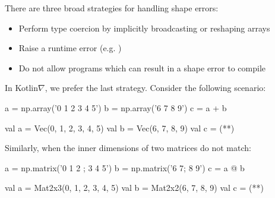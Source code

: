 \documentclass[portrait,a0b,final,a4resizeable]{a0poster}
\begin{document}
\begin{poster}
\begin{multicols}{2}
      \vspace*{-1cm}
      \null\hspace*{3cm}\begin{minipage}[c]{0.85\columnwidth}

      There are three broad strategies for handling shape errors:
      \begin{itemize}[leftmargin=1in]
        \item Perform type coercion by implicitly broadcasting or reshaping arrays
        \item Raise a runtime error (e.g. )
        \item Do not allow programs which can result in a shape error to compile
      \end{itemize}

      In Kotlin$\nabla$, we prefer the last strategy. Consider the following scenario:
      \end{minipage}

\null\hspace*{2cm}\begin{minipage}[c]{0.40\columnwidth}
\begin{pythonlisting}
a = np.array('0 1 2 3 4 5')
b = np.array('6 7 8 9')
c = a + b
\end{pythonlisting}
\end{minipage}
\null\hspace*{2cm}\begin{minipage}[c]{0.45\columnwidth}
\begin{kotlinlisting}
val a = Vec(0, 1, 2, 3, 4, 5)
val b = Vec(6, 7, 8, 9)
val c = (**)
\end{kotlinlisting}
\end{minipage}

\null\hspace*{3cm}\begin{minipage}[c]{0.85\columnwidth}
Similarly, when the inner dimensions of two matrices do not match:
\end{minipage}

\vspace*{-1cm}
\null\hspace*{2cm}\begin{minipage}[c]{0.40\columnwidth}
\begin{pythonlisting}
a = np.matrix('0 1 2 ; 3 4 5')
b = np.matrix('6 7; 8 9')
c = a @ b
                          \end{pythonlisting}
      \end{minipage}
      \null\hspace*{2cm}\begin{minipage}[c]{0.42\columnwidth}
                          \begin{kotlinlisting}
val a = Mat2x3(0, 1, 2, 3, 4, 5)
val b = Mat2x2(6, 7, 8, 9)
val c = (**)
                          \end{kotlinlisting}
      \end{minipage}


\end{multicols}
\end{poster}
\end{document}
